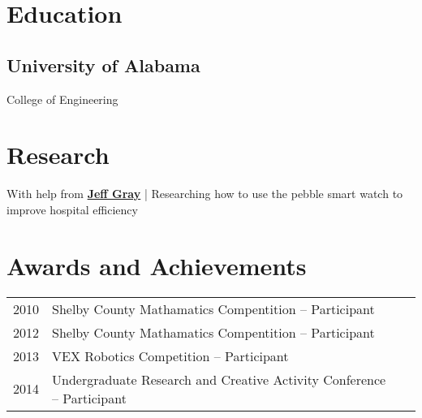 \documentclass[letterpaper]{deedy-resume} %
\begin{document}
\begin{minipage}[t]{0.66\textwidth} %





\section{Education} 

\subsection{University of Alabama}


College of Engineering \\

\sectionspace %


\section{Research}


With help from \textbf{\href{http://gray.cs.ua.edu}{Jeff Gray}} | Researching how to use the pebble smart watch to improve hospital efficiency 

\sectionspace %


 \section{Awards and Achievements} 
 \begin{tabular}{rll}
 2010	& Shelby County Mathamatics Compentition -- Participant \\
 2012	& Shelby County Mathamatics Compentition -- Participant \\
 2013 & VEX Robotics Competition -- Participant \\
2014	 &Undergraduate Research and Creative Activity Conference -- Participant \\


\end{tabular}
\end{minipage}
\end{document}
